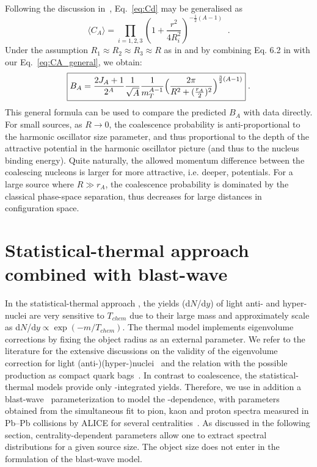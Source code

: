 \documentclass[%
 reprint,
 amsmath,amssymb,
 aps,
]{revtex4-1}
\begin{document}
Following the discussion in~\cite{Scheibl:1998tk, Blum:2017qnn}, Eq.~\ref{eq:Cd} may be generalised as 
%
\begin{equation}
\langle C_{A} \rangle = \prod_{i=1,2,3} \left(1 + \frac{r^2}{4R_{i}^2} \right)^{-\frac{1}{2}(A-1)} \;\; .
\label{eq:CA_general}
\end{equation}
%
Under the assumption $R_1\approx R_2 \approx R_3 \approx R$ as in \cite{Blum:2017qnn} and by combining Eq. 6.2 in \cite{Scheibl:1998tk} with our Eq.~\ref{eq:CA_general}, 
we obtain:
%
\begin{equation}\label{eq:master}
	\boxed {  B_{A} = {2J_{A} + 1 \over 2^{A}} {1 \over \sqrt{A}} {1 \over m_{T}^{A-1}} \Bigl({2\pi \over R^2 + ({r_A \over 2})^2 }\Bigr)^{\frac{3}{2}(A-1)} } \;.
\end{equation}
%
This general formula can be used to compare the predicted $B_{A}$ with data directly.
For small sources, as $R \rightarrow 0$, the coalescence probability is anti-proportional to the harmonic oscillator size parameter, and thus proportional to the depth of the attractive potential in the harmonic oscillator picture (and thus to the nucleus binding energy).
Quite naturally, the allowed momentum difference between the coalescing nucleons is larger for more attractive, i.e. deeper, potentials. 
For a large source where $R \gg r_A$, the coalescence probability is dominated by the classical phase-space separation, thus decreases for large distances in configuration space. 
%

\section{Statistical-thermal approach combined with blast-wave}\label{sec:thermal}
In the statistical-thermal approach \cite{Petran:2013dva,Wheaton:2004qb,Andronic:2005yp}, the yields (d$N$/d$y$) of light anti- and hyper-nuclei are very sensitive to $T_{chem}$ due to their large mass and approximately scale as d$N$/d$y \propto \exp(-m/T_{chem})$. 
The thermal model implements eigenvolume corrections by fixing the object radius as an external parameter.
We refer to the literature for the extensive discussions on the validity of the eigenvolume correction for light \mbox{(anti-)(hyper-)}nuclei~\cite{Vovchenko:2016mwg} and the relation with the possible production as compact quark bags~\cite{Andronic:2017}.
In contrast to coalescence, the statistical-thermal models provide only \pt-integrated yields. 
Therefore, we use in addition a blast-wave~\cite{Schnedermann:1993ws} parameterization to model the \pt-dependence, with parameters obtained from the simultaneous fit to pion, kaon and proton spectra measured in Pb--Pb collisions by ALICE for several centralities~\cite{Abelev:2013vea}.  
 As discussed in the following section, centrality-dependent parameters allow one to extract spectral distributions for a given source size. 
The object size does not enter in the formulation of the blast-wave model.
\end{document}
